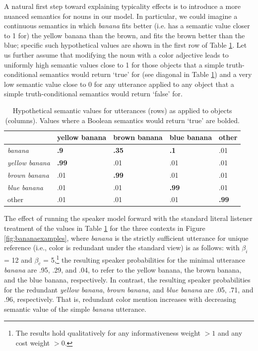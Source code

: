 \documentclass[11pt]{article}
\newcommand{\tableref}[1]{Table \ref{#1}}
\newcommand{\figref}[1]{Figure \ref{#1}}
\begin{document}
A natural first step toward explaining typicality effects is to introduce a more nuanced semantics for nouns in our model. 
In particular, we could imagine a continuous semantics in which \emph{banana} fits better (i.e. has a semantic value closer to 1 for) the yellow banana than the brown, and fits the brown better than the blue; specific such hypothetical values are shown in the first row of \tableref{tab:colorobjectfidelities}. Let us further assume that modifying the noun with a color adjective leads to uniformly high semantic values close to 1 for those objects that a simple truth-conditional semantics would return `true' for (see diagonal in \tableref{tab:colorobjectfidelities}) and a very low semantic value close to 0 for any utterance applied to any object that a simple truth-conditional semantics would return `false' for.

\begin{table}
\centering
\caption{Hypothetical semantic values for utterances (rows) as applied to objects (columns). Values where a Boolean semantics would return `true' are bolded.}
\begin{tabular}{l l l l l}
\toprule
 & yellow banana & brown banana & blue banana & other\\
\midrule
\emph{banana} & \bf{.9} & \bf{.35} & \bf{.1} & .01 \\
\midrule
\emph{yellow banana} & \bf{.99} & .01 & .01 & .01 \\
\emph{brown banana} & .01 & \bf{.99} & .01 & .01 \\
\emph{blue banana} & .01 & .01 & \bf{.99} & .01 \\
\midrule
other & .01 & .01 & .01 & \bf{.99} \\
\bottomrule
\end{tabular}
\label{tab:colorobjectfidelities}
\end{table}

The effect of running the speaker model forward with the standard literal listener treatment of the values in \tableref{tab:colorobjectfidelities} for the three contexts in \figref{fig:bananaexamples}, where \emph{banana} is the strictly sufficient utterance for unique reference (i.e., color is redundant under the standard view) is as follows:  with $\beta_i$ = 12 and $\beta_c$ = 5,\footnote{The results hold qualitatively for any informativeness weight $> 1$ and any cost weight $> 0$.} the resulting speaker probabilities for the minimal utterance \emph{banana} are .95, .29, and .04, to refer to the yellow banana, the brown banana, and the blue banana, respectively. In contrast, the resulting speaker probabilities for the redundant \emph{yellow banana}, \emph{brown banana}, and \emph{blue banana} are .05, .71, and .96, respectively. That is, redundant color mention increases with decreasing semantic value of the simple \emph{banana} utterance. 
\end{document}
